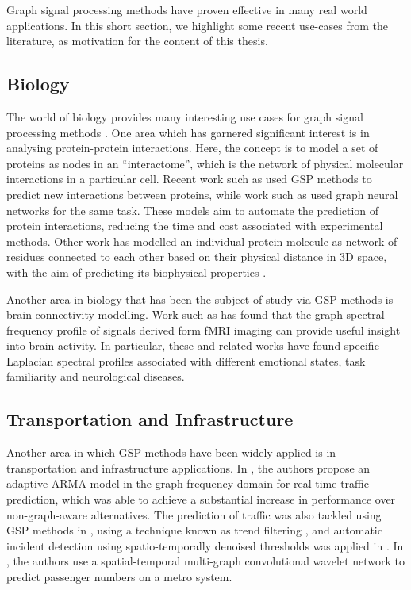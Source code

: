 Graph signal processing methods have proven effective in many real world applications. In this short section, we highlight some recent use-cases from the literature, as motivation for the content of this thesis. 

\subsection{Biology}

The world of biology provides many interesting use cases for graph signal processing methods \citep{Li2023}. One area which has garnered significant interest is in analysing protein-protein interactions. Here, the concept is to model a set of proteins as nodes in an ``interactome'', which is the network of physical molecular interactions in a particular cell. Recent work such as \cite{Colonnese2021} used GSP methods to predict new interactions between proteins, while work such as \cite{Jha2022} used graph neural networks for the same task. These models aim to automate the prediction of protein interactions, reducing the time and cost associated with experimental methods. Other work has modelled an individual protein molecule as network of residues connected to each other based on their physical distance in 3D space, with the aim of predicting its biophysical properties \citep{Srivastava2023}. 

Another area in biology that has been the subject of study via GSP methods is brain connectivity modelling. Work such as \cite{Goldsberry2017,Atasoy2016,Menoret2017,Itani2021} has found that the graph-spectral frequency profile of signals derived form fMRI imaging can provide useful insight into brain activity. In particular, these and related works have found specific Laplacian spectral profiles associated with different emotional states, task familiarity and neurological diseases. 

\subsection{Transportation and Infrastructure}

Another area in which GSP methods have been widely applied is in transportation and infrastructure applications. In \cite{Hasanzadeh2017}, the authors propose an adaptive ARMA model in the graph frequency domain for real-time traffic prediction, which was able to achieve a substantial increase in performance over non-graph-aware alternatives. The prediction of traffic was also tackled using GSP methods in \cite{Chakraborty2017}, using a technique known as trend filtering \citep{Wang2016}, and automatic incident detection using spatio-temporally denoised thresholds was applied in \citep{Chakraborty2019}. In \cite{Xiu2022}, the authors use a spatial-temporal multi-graph convolutional wavelet network to predict passenger numbers on a metro system. 

